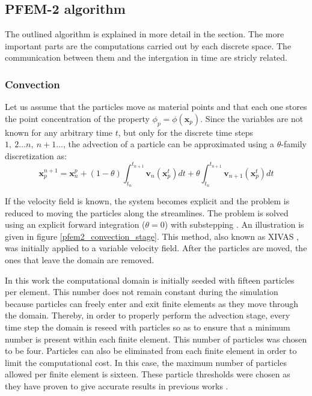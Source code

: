 \subsection{PFEM-2 algorithm}


The outlined algorithm is explained in more detail in the section. The more important parts are the computations carried out by each discrete space. The communication between them and the intergation in time are stricly related.


\subsubsection{Convection}


Let us assume that the particles move as material points and that each one stores the point concentration of the property $\phi_p = \phi(\mathbf x_p)$. Since the variables are not known for any arbitrary time $t$, but only for the discrete time steps $1,\ 2\dots n,\ n+1\dots$, the advection of a particle can be approximated using a $\theta$-family discretization as:
\begin{equation}
\mathbf{x}_p^{n+1} = \mathbf{x}_n^p + (1-\theta) \int_{t_n}^{t_{n+1}} \mathbf{v}_n(\mathbf{x}_p^t)dt + \theta \int_{t_n}^{t_{n+1}} \mathbf{v}_{n+1}(\mathbf{x}_p^t)dt
\end{equation}

If the velocity field is known, the system becomes explicit and the problem is reduced to moving the particles along the streamlines. The problem is solved using an explicit forward integration ($\theta=0$) with substepping \cite{idelsohn2012}. An illustration is given in figure \ref{pfem2_convection_stage}. This method, also known as XIVAS \cite{idelsohn2013}\cite{idelsohn2014}, was initially applied to a variable velocity field.
After the particles are moved, the ones that leave the domain are removed.

In this work the computational domain is initially seeded with fifteen particles per element. This number does not remain constant during the simulation because particles can freely enter and exit finite elements as they move through the domain. Thereby, in order to properly perform the advection stage, every time step the domain is reseed with particles so as to ensure that a minimum number is present within each finite element. This number of particles was chosen to be four. Particles can also be eliminated from each finite element in order to limit the computational cost. In this case, the maximum number of particles allowed per finite element is sixteen. These particle thresholds were chosen as they have proven to give accurate results in previous works \cite{idelsohn2015}.

